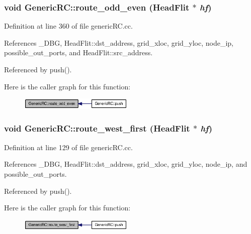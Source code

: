 \subsubsection[{route\_\-odd\_\-even}]{\setlength{\rightskip}{0pt plus 5cm}void GenericRC::route\_\-odd\_\-even ({\bf HeadFlit} $\ast$ {\em hf})\hspace{0.3cm}{\tt  [private]}}\label{classGenericRC_d526138b552d15f51d8683c71969182e}




Definition at line 360 of file genericRC.cc.

References \_\-DBG, HeadFlit::dst\_\-address, grid\_\-xloc, grid\_\-yloc, node\_\-ip, possible\_\-out\_\-ports, and HeadFlit::src\_\-address.

Referenced by push().

Here is the caller graph for this function:\nopagebreak
\begin{figure}[H]
\begin{center}
\leavevmode
\includegraphics[width=154pt]{classGenericRC_d526138b552d15f51d8683c71969182e_icgraph}
\end{center}
\end{figure}
\subsubsection[{route\_\-west\_\-first}]{\setlength{\rightskip}{0pt plus 5cm}void GenericRC::route\_\-west\_\-first ({\bf HeadFlit} $\ast$ {\em hf})\hspace{0.3cm}{\tt  [private]}}\label{classGenericRC_ff442fded7b3cda5205aa97e502fca2a}




Definition at line 129 of file genericRC.cc.

References \_\-DBG, HeadFlit::dst\_\-address, grid\_\-xloc, grid\_\-yloc, node\_\-ip, and possible\_\-out\_\-ports.

Referenced by push().

Here is the caller graph for this function:\nopagebreak
\begin{figure}[H]
\begin{center}
\leavevmode
\includegraphics[width=154pt]{classGenericRC_ff442fded7b3cda5205aa97e502fca2a_icgraph}
\end{center}
\end{figure}
